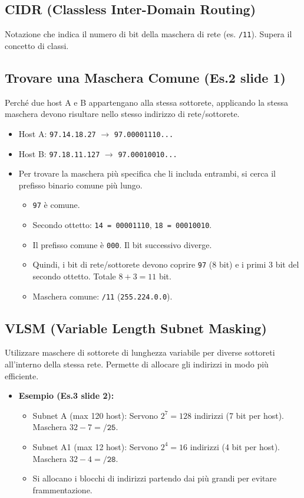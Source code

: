 \subsection{CIDR (Classless Inter-Domain Routing)}
Notazione che indica il numero di bit della maschera di rete (es. \texttt{/11}). Supera il concetto di classi.

\subsection{Trovare una Maschera Comune (Es.2 slide 1)}
Perché due host A e B appartengano alla stessa sottorete, applicando la stessa maschera devono risultare nello stesso indirizzo di rete/sottorete.
\begin{itemize}
    \item Host A: \texttt{97.14.18.27} $\rightarrow$ \texttt{97.00001110...}
    \item Host B: \texttt{97.18.11.127} $\rightarrow$ \texttt{97.00010010...}
    \item Per trovare la maschera più specifica che li includa entrambi, si cerca il prefisso binario comune più lungo.
    \begin{itemize}
        \item \texttt{97} è comune.
        \item Secondo ottetto: \texttt{14 = 00001110}, \texttt{18 = 00010010}.
        \item Il prefisso comune è \texttt{000}. Il bit successivo diverge.
        \item Quindi, i bit di rete/sottorete devono coprire \texttt{97} (8 bit) e i primi 3 bit del secondo ottetto. Totale $8 + 3 = 11$ bit.
        \item Maschera comune: \texttt{/11} (\texttt{255.224.0.0}).
    \end{itemize}
\end{itemize}

\subsection{VLSM (Variable Length Subnet Masking)}
Utilizzare maschere di sottorete di lunghezza variabile per diverse sottoreti all'interno della stessa rete. Permette di allocare gli indirizzi in modo più efficiente.
\begin{itemize}
    \item \textbf{Esempio (Es.3 slide 2):}
    \begin{itemize}
        \item Subnet A (max 120 host): Servono $2^7 = 128$ indirizzi (7 bit per host). Maschera $32 - 7 = \texttt{/25}$.
        \item Subnet A1 (max 12 host): Servono $2^4 = 16$ indirizzi (4 bit per host). Maschera $32 - 4 = \texttt{/28}$.
        \item Si allocano i blocchi di indirizzi partendo dai più grandi per evitare frammentazione.
    \end{itemize}
\end{itemize}

